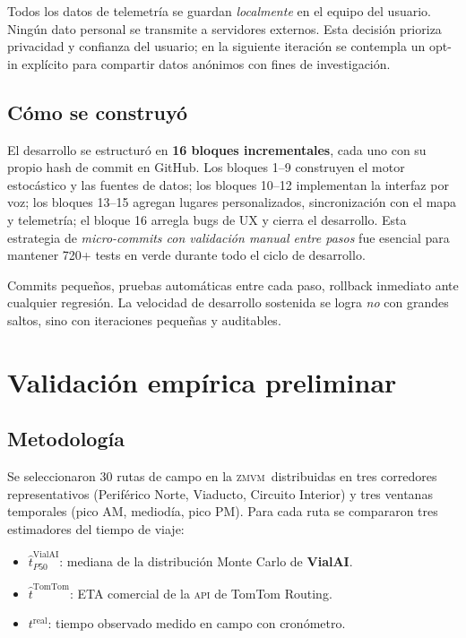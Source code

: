 \documentclass[11pt,a4paper]{article}
\newcommand{\VialAI}{\textbf{\textcolor{vialTeal}{Vial}\textcolor{vialAmber}{AI}}}
\newcommand{\ZMVM}{\textsc{zmvm}}
\begin{document}
Todos los datos de telemetría se guardan \emph{localmente} en el
equipo del usuario. Ningún dato personal se transmite a
servidores externos. Esta decisión prioriza privacidad y
confianza del usuario; en la siguiente iteración se contempla un
opt-in explícito para compartir datos anónimos con fines de
investigación.

\subsection{Cómo se construyó}

El desarrollo se estructuró en \textbf{\num{16} bloques
incrementales}, cada uno con su propio hash de commit en
GitHub. Los bloques \num{1}--\num{9} construyen el motor
estocástico y las fuentes de datos; los bloques
\num{10}--\num{12} implementan la interfaz por voz; los bloques
\num{13}--\num{15} agregan lugares personalizados,
sincronización con el mapa y telemetría; el bloque \num{16}
arregla bugs de UX y cierra el desarrollo. Esta estrategia de
\emph{micro-commits con validación manual entre pasos} fue
esencial para mantener \num{720}+ tests en verde durante todo
el ciclo de desarrollo.

\begin{tipbox}
Commits pequeños, pruebas automáticas entre cada paso, rollback
inmediato ante cualquier regresión. La velocidad de desarrollo
sostenida se logra \emph{no} con grandes saltos, sino con
iteraciones pequeñas y auditables.
\end{tipbox}

\section{Validación empírica preliminar}
\label{sec:validacion}

\subsection{Metodología}

Se seleccionaron \num{30} rutas de campo en la \ZMVM\ distribuidas
en tres corredores representativos (Periférico Norte, Viaducto,
Circuito Interior) y tres ventanas temporales (pico AM,
mediodía, pico PM). Para cada ruta se compararon tres
estimadores del tiempo de viaje:

\begin{itemize}
\item $\hat{t}_{P50}^{\text{VialAI}}$: mediana de la distribución
Monte Carlo de \VialAI.
\item $\hat{t}^{\text{TomTom}}$: ETA comercial de la \textsc{api}
de TomTom Routing.
\item $t^{\text{real}}$: tiempo observado medido en campo con
cronómetro.
\end{itemize}
\end{document}
